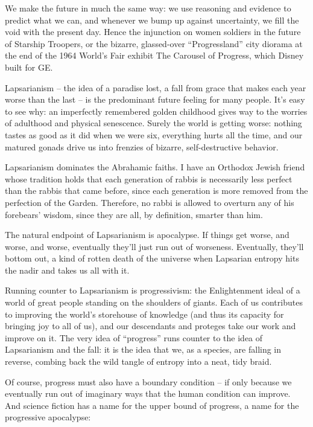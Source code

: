 We make the future in much the same way: we use reasoning and
evidence to predict what we can, and whenever we bump up against
uncertainty, we fill the void with the present day. Hence the
injunction on women soldiers in the future of Starship Troopers, or
the bizarre, glassed-over ``Progressland'' city diorama at the end of
the 1964 World's Fair exhibit The Carousel of Progress, which
Disney built for GE.

Lapsarianism -- the idea of a paradise lost, a fall from grace that
makes each year worse than the last -- is the predominant future
feeling for many people. It's easy to see why: an imperfectly
remembered golden childhood gives way to the worries of adulthood
and physical senescence. Surely the world is getting worse: nothing
tastes as good as it did when we were six, everything hurts all the
time, and our matured gonads drive us into frenzies of bizarre,
self-destructive behavior.

Lapsarianism dominates the Abrahamic faiths. I have an Orthodox
Jewish friend whose tradition holds that each generation of rabbis
is necessarily less perfect than the rabbis that came before, since
each generation is more removed from the perfection of the Garden.
Therefore, no rabbi is allowed to overturn any of his forebears'
wisdom, since they are all, by definition, smarter than him.

The natural endpoint of Lapsarianism is apocalypse. If things get
worse, and worse, and worse, eventually they'll just run out of
worseness. Eventually, they'll bottom out, a kind of rotten death
of the universe when Lapsarian entropy hits the nadir and takes us
all with it.

Running counter to Lapsarianism is progressivism: the Enlightenment
ideal of a world of great people standing on the shoulders of
giants. Each of us contributes to improving the world's storehouse
of knowledge (and thus its capacity for bringing joy to all of us),
and our descendants and proteges take our work and improve on it.
The very idea of ``progress'' runs counter to the idea of
Lapsarianism and the fall: it is the idea that we, as a species,
are falling in reverse, combing back the wild tangle of entropy
into a neat, tidy braid.

Of course, progress must also have a boundary condition -- if only
because we eventually run out of imaginary ways that the human
condition can improve. And science fiction has a name for the upper
bound of progress, a name for the progressive apocalypse:

